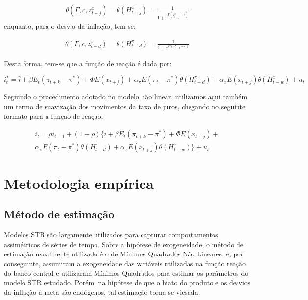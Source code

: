 \documentclass[
	article,			%
	11pt,				%
	oneside,			%
	a4paper,			%
	english,			%
	brazil,				%
	]{abntex2}
\begin{document}
	\begin{eqnarray}  \label{func_log_hiato}
		\theta (\Gamma,c,z_{t-j}^x) = \theta (H_{t-j}^x) = \frac{1}{1+e^{\Gamma (z_{t-j}^x - c)}} 
	\end{eqnarray}
	enquanto, para o desvio da inflação, tem-se:
	
	\begin{eqnarray}  \label{func_log_inflacao}
		\theta (\Gamma,c,z_{t-d}^\pi) = \theta (H_{t-d}^\pi) = \frac{1}{1+e^{\Gamma (z_{t-d}^\pi - c)}} 
	\end{eqnarray}
	
	Desta forma, tem-se que a função de reação é dada por:
	
	\begin{equation}
		i_t^* = \bar{i} + \beta E_t(\pi_{t+k} - \pi^*) + \Phi E(x_{t+j}) + \alpha_\pi E(\pi_t - \pi^*)\theta(H_{t-d}^\pi) + \alpha_x E(x_{t+j}) \theta (H_{t-w}^x) + u_t
	\end{equation}
	
	Seguindo o procedimento adotado no modelo não linear, utilizamos aqui também um termo de suavização dos movimentos da taxa de juros, chegando no seguinte formato para a função de reação:
	
	\begin{eqnarray}  \label{modelo_nao_linear}
		i_t = \rho i_{t-1} + (1-\rho) \{ \bar{i} + \beta E_t(\pi_{t+k} - \pi^*) + \Phi E(x_{t+j}) + \nonumber \\ 
		 \alpha_\pi E(\pi_t - \pi^*)\theta(H_{t-d}^\pi) + \alpha_x E(x_{t+j}) \theta (H_{t-w}^x) \} + u_t
	\end{eqnarray}
	


	
	\section{Metodologia empírica}	
	
	\subsection{Método de estimação}
	
	Modelos STR são largamente utilizados para capturar comportamentos assimétricos de séries de tempo. Sobre a hipótese de exogeneidade, o método de estimação usualmente utilizado é o de Mínimos Quadrados Não Lineares.  e, por conseguinte,  assumiram a exogeneidade das variáveis utilizadas na função reação do banco central e utilizaram Mínimos Quadrados para estimar os parâmetros do modelo STR estudado. Porém, na hipótese de que o hiato do produto e os desvios da inflação à meta são endógenos, tal estimação torna-se viesada.
	
\end{document}
